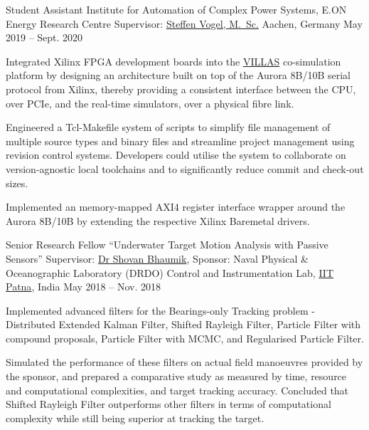 \begin{cvexperience}
\cvposition
	{Student Assistant} %
	{Institute for Automation of Complex Power Systems, E.ON Energy Research Centre} %
	{Supervisor: \href{https://www.acs.eonerc.rwth-aachen.de/go/id/msul}{Steffen Vogel, M.\, Sc.}} %
	{Aachen, Germany} %
	{May 2019 -- Sept. 2020} %
	{\begin{cvitems}
		\item {Integrated Xilinx FPGA development boards into the \href{https://villas.fein-aachen.org}{VILLAS} co-simulation platform by designing an architecture built on top of the Aurora 8B/10B serial protocol from Xilinx, thereby providing a consistent interface between the CPU, over PCIe, and the real-time simulators, over a physical fibre link.}
		\item {Engineered a Tcl-Makefile system of scripts to simplify file management of multiple source types and binary files and streamline project management using revision control systems. Developers could utilise the system to collaborate on version-agnostic local toolchains and to significantly reduce commit and check-out sizes.}
		\item {Implemented an memory-mapped AXI4 register interface wrapper around the Aurora 8B/10B by extending the respective Xilinx Baremetal drivers.}
	\end{cvitems}}

\cvposition
	{Senior Research Fellow} %
	{``Underwater Target Motion Analysis with Passive Sensors''} %
	{Supervisor: \href{http://www.tutorialpoint.org/ShovanBhaumik/index.html}{Dr Shovan Bhaumik}, Sponsor: Naval Physical \& Oceanographic Laboratory (DRDO)} %
	{Control and Instrumentation Lab, \href{https://www.iitp.ac.in}{IIT Patna}, India} %
	{May 2018 -- Nov. 2018} %
	{\begin{cvitems} %
		\item {Implemented advanced filters for the Bearings-only Tracking problem - Distributed Extended Kalman Filter, Shifted Rayleigh Filter, Particle Filter with compound proposals, Particle Filter with MCMC, and Regularised Particle Filter.}
		\item {Simulated the performance of these filters on actual field manoeuvres provided by the sponsor, and prepared a comparative study as measured by time, resource and computational complexities, and target tracking accuracy. Concluded that Shifted Rayleigh Filter outperforms other filters in terms of computational complexity while still being superior at tracking the target.}
	\end{cvitems}}


\end{cvexperience}
